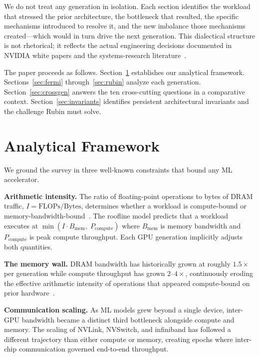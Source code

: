 \documentclass[10pt,twocolumn]{article}
\begin{document}
We do not treat any generation in isolation. Each section identifies the workload that stressed the prior architecture, the bottleneck that resulted, the specific mechanisms introduced to resolve it, and the new imbalance those mechanisms created—which would in turn drive the next generation. This dialectical structure is not rhetorical; it reflects the actual engineering decisions documented in NVIDIA white papers and the systems-research literature~\citep{markidis2018nvidia,choquette2021nvidia}.

The paper proceeds as follows. Section~\ref{sec:framework} establishes our analytical framework. Sections~\ref{sec:fermi} through~\ref{sec:rubin} analyze each generation. Section~\ref{sec:crossgen} answers the ten cross-cutting questions in a comparative context. Section~\ref{sec:invariants} identifies persistent architectural invariants and the challenge Rubin must solve.

\section{Analytical Framework}
\label{sec:framework}

We ground the survey in three well-known constraints that bound any ML accelerator.

\textbf{Arithmetic intensity.} The ratio of floating-point operations to bytes of DRAM traffic, $I = \text{FLOPs}/\text{Bytes}$, determines whether a workload is compute-bound or memory-bandwidth-bound~\citep{williams2009roofline}. The roofline model predicts that a workload executes at $\min(I \cdot B_{\text{mem}},\; P_{\text{compute}})$ where $B_{\text{mem}}$ is memory bandwidth and $P_{\text{compute}}$ is peak compute throughput. Each GPU generation implicitly adjusts both quantities.

\textbf{The memory wall.} DRAM bandwidth has historically grown at roughly $1.5\times$ per generation while compute throughput has grown $2\text{--}4\times$, continuously eroding the effective arithmetic intensity of operations that appeared compute-bound on prior hardware~\citep{wulf1995hitting}.

\textbf{Communication scaling.} As ML models grew beyond a single device, inter-GPU bandwidth became a distinct third bottleneck alongside compute and memory. The scaling of NVLink, NVSwitch, and infiniband has followed a different trajectory than either compute or memory, creating epochs where inter-chip communication governed end-to-end throughput.
\end{document}
